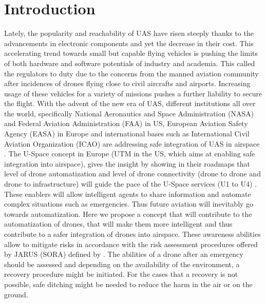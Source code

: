 
\chapter{Introduction}


Lately, the popularity and reachability of UAS have risen steeply thanks to the advancements in electronic components and yet the decrease in their cost. 
This accelerating trend towards small but capable flying vehicles is pushing the limits of both hardware and software potentials of industry and academia. 
This called the regulators to duty due to the concerns from the manned aviation community after incidences of drones flying close to civil aircrafts and airports. 
Increasing usage of these vehicles for a variety of missions pushes a further liability to secure the flight.
With the advent of the new era of UAS, different institutions all over the world, specifically National Aeronautics and Space Administration (NASA) 
\cite{kopardekarunmanned} and Federal Aviation Administration (FAA) \cite{FAA_UASintegration} in US, European Aviation Safety Agency (EASA) \cite{A_NPA_EASA2015} in Europe and international bases such as International Civil Aviation Organization (ICAO) \cite{ICAO_Circular} are addressing safe integration of UAS in airspace \cite{baskaya2016flexible}.
The U-Space concept in Europe (UTM in the US, which aims at enabling safe integration into airspace), gives the insight by showing in their roadmaps that level of drone automatization and level of drone connectivity (drone to drone and drone to infrastructure) will guide the pace of the U-Space services (U1 to U4) \cite{undertaking2017u}. 
These enablers will allow intelligent agents to share information and automate complex situations such as emergencies. 
Thus future aviation will inevitably go towards automatization. 
Here we propose a concept that will contribute to the automatization of drones, that will make them more intelligent and thus contribute to a safer integration of drones into airspace. 
These awareness abilities allow to mitigate risks in accordance with the risk assessment procedures offered by JARUS (SORA) \cite{SORA} defined by \cite{EASAopinion2018}. 
The abilities of a drone after an emergency should be assessed and depending on the availability of the environment, a recovery procedure might be initiated. 
For the cases that a recovery is not possible, safe ditching might be needed to reduce the harm in the air or on the ground. 
 

